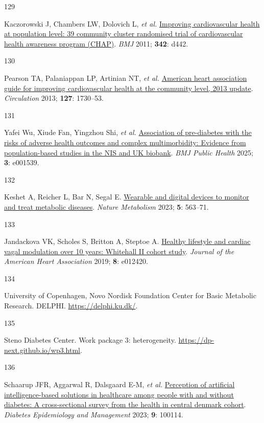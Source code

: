 \documentclass[
  a4paper,
  headsepline=true,
  open=left]{scrbook}
\newlength{\cslhangindent}
\newlength{\csllabelwidth}
\newlength{\cslentryspacingunit} %
\newenvironment{CSLReferences}[2] %
 {%
  \setlength{\parindent}{0pt}
  \ifodd #1
  \let\oldpar\par
  \def\par{\hangindent=\cslhangindent\oldpar}
  \fi
  \setlength{\parskip}{#2\cslentryspacingunit}
 }%
 {}
\newcommand{\CSLLeftMargin}[1]{\parbox[t]{\csllabelwidth}{#1}}
\newcommand{\CSLRightInline}[1]{\parbox[t]{\linewidth - \csllabelwidth}{#1}\break}
\begin{document}
\begin{CSLReferences}{0}{0}
\leavevmode{}%
\CSLLeftMargin{129 }%
\CSLRightInline{Kaczorowski J, Chambers LW, Dolovich L, \emph{et al.}
\href{https://doi.org/10.1136/bmj.d442}{Improving cardiovascular health
at population level: 39 community cluster randomised trial of
cardiovascular health awareness program (CHAP)}. \emph{BMJ} 2011;
\textbf{342}: d442.}

\leavevmode{}%
\CSLLeftMargin{130 }%
\CSLRightInline{Pearson TA, Palaniappan LP, Artinian NT, \emph{et al.}
\href{https://doi.org/10.1161/CIR.0b013e31828f8a94}{American heart
association guide for improving cardiovascular health at the community
level, 2013 update}. \emph{Circulation} 2013; \textbf{127}: 1730--53.}

\leavevmode{}%
\CSLLeftMargin{131 }%
\CSLRightInline{Yafei Wu, Xiude Fan, Yingzhou Shi, \emph{et al.}
\href{https://doi.org/10.1136/bmjph-2024-001539}{Association of
pre-diabetes with the risks of adverse health outcomes and complex
multimorbidity: Evidence from population-based studies in the NIS and UK
biobank}. \emph{BMJ Public Health} 2025; \textbf{3}: e001539.}

\leavevmode{}%
\CSLLeftMargin{132 }%
\CSLRightInline{Keshet A, Reicher L, Bar N, Segal E.
\href{https://doi.org/10.1038/s42255-023-00778-y}{Wearable and digital
devices to monitor and treat metabolic diseases}. \emph{Nature
Metabolism} 2023; \textbf{5}: 563--71.}

\leavevmode{}%
\CSLLeftMargin{133 }%
\CSLRightInline{Jandackova VK, Scholes S, Britton A, Steptoe A.
\href{https://doi.org/10.1161/JAHA.119.012420}{Healthy lifestyle and
cardiac vagal modulation over 10 years: Whitehall II cohort study}.
\emph{Journal of the American Heart Association} 2019; \textbf{8}:
e012420.}

\leavevmode{}%
\CSLLeftMargin{134 }%
\CSLRightInline{University of Copenhagen, Novo Nordisk Foundation Center
for Basic Metabolic Research. DELPHI. \url{https://delphi.ku.dk/}.}

\leavevmode{}%
\CSLLeftMargin{135 }%
\CSLRightInline{Steno Diabetes Center. Work package 3: heterogeneity.
\url{https://dp-next.github.io/wp3.html}.}

\leavevmode{}%
\CSLLeftMargin{136 }%
\CSLRightInline{Schaarup JFR, Aggarwal R, Dalsgaard E-M, \emph{et al.}
\href{https://doi.org/10.1016/j.deman.2022.100114}{Perception of
artificial intelligence-based solutions in healthcare among people with
and without diabetes: A cross-sectional survey from the health in
central denmark cohort}. \emph{Diabetes Epidemiology and Management}
2023; \textbf{9}: 100114.}


\end{CSLReferences}
\end{document}
